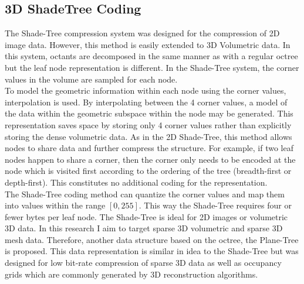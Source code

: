 \subsection{3D ShadeTree Coding}

\label{sec:dr:coding}

The Shade-Tree compression system \cite{Gonzalez07ShadeTree} was designed for the compression of 2D image data. However, this method is easily extended to 3D Volumetric data. In this system, octants are decomposed in the same manner as with a regular octree but the leaf node representation is different. In the Shade-Tree system, the corner values in the volume are sampled for each node.  \\


To model the geometric information within each node using the corner values, interpolation is used. By interpolating between the 4 corner values, a model of the data within the geometric subspace within the node may be generated. This representation saves space by storing only 4 corner values rather than explicitly storing the dense volumetric data. As in the 2D Shade-Tree, this method allows nodes to share data and further compress the structure. For example, if two leaf nodes happen to share a corner, then the corner only needs to be encoded at the node which is visited first according to the ordering of the tree (breadth-first or depth-first). This constitutes no additional coding for the representation. \\

The Shade-Tree coding method can quantize the corner values and map them into values within the range $[0,255]$. This way the Shade-Tree requires four or fewer bytes per leaf node. The Shade-Tree is ideal for 2D images or volumetric 3D data. In this research I aim to target sparse 3D volumetric and sparse 3D mesh data. Therefore, another data structure based on the octree, the Plane-Tree is proposed. This data representation is similar in idea to the Shade-Tree but was designed for low bit-rate compression of sparse 3D data as well as occupancy grids which are commonly generated by 3D reconstruction algorithms. \\


